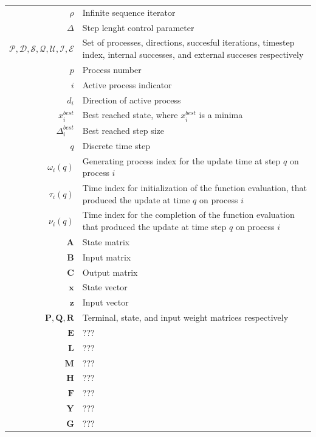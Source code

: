 \begin{scriptsize}
\begin{tabularx}{\textwidth}{r|X}
	$\rho$																& Infinite sequence iterator\\
	$\Delta$													& Step lenght control parameter\\
	$\mathcal{P},\mathcal{D},\mathcal{S},\mathcal{Q},\mathcal{U},\mathcal{I},\mathcal{E}$ & Set of processes, directions, succesful iterations, timestep index, internal successes, and external succeses respectively\\
	$p$																& Process number\\
	$i$																& Active process indicator\\
	$d_i$															& Direction of active process\\
	$x_i^{best}$											& Best reached state, where $x_i^{best}$ is a minima\\
	$\Delta_i^{best}$											& Best reached step size\\
	$q$																& Discrete time step\\
	$\omega_i(q)$ 										& Generating process index for the update time at step $q$ on process $i$\\
	$\tau_i(q)$												& Time index for initialization of the function evaluation, that produced the update at time $q$ on process $i$\\
	$\nu_i(q)$ 												& Time index for the completion of the function evaluation that produced the update at time step $q$ on process $i$\\
	$\textbf{A}$																& State matrix\\
	$\textbf{B}$																& Input matrix\\
	$\textbf{C}$																& Output matrix\\
	$\textbf{x}$											& State vector\\
	$\textbf{z}$											& Input vector\\
	$\textbf{P}, \textbf{Q},\textbf{R}$ & Terminal, state, and input weight matrices respectively\\
	$\textbf{E}$																&???\\
	$\textbf{L}$																&???\\
	$\textbf{M}$																&???\\
	$\textbf{H}$																&???\\
	$\textbf{F}$																&???\\
	$\textbf{Y}$																&???\\
	$\textbf{G}$																&???\\

\end{tabularx}
\end{scriptsize}
